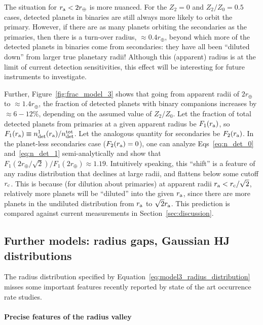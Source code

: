 \documentclass[12pt,modern]{aastex61}
\renewcommand{\a}{_{\rm a}}
\begin{document}
The situation for $r\a < 2r_\oplus$ is more nuanced.
For the $Z_2=0$ and $Z_2/Z_0=0.5$ cases, detected planets in binaries are 
still always more likely to orbit the primary.
However, if there are as many planets orbiting the secondaries as the 
primaries, then there is a turn-over radius, $\approx 0.4r_\oplus$, 
beyond which more of the detected planets in binaries come from secondaries: 
they have all been ``diluted down'' from larger true planetary radii!
Although this (apparent) radius is at the limit of current detection 
sensitivities, this effect will be interesting for future instruments to 
investigate.

Further, Figure~\ref{fig:frac_model_3} shows that going from apparent 
radii of $2r_\oplus$ to $\approx 1.4r_\oplus$, the fraction of detected 
planets with binary companions increases by $\approx 6-12\%$, depending on the 
assumed value of $Z_2/Z_0$.
Let the fraction of total detected planets from primaries at a given 
apparent radius be $F_1(r\a)$, so $F_1(r\a) \equiv n_{\rm det}^1(r\a)/n_{\rm 
det}^{\rm tot}$.
Let the analogous quantity for secondaries be $F_2(r\a)$.
In the planet-less secondaries case ($F_2(r\a)=0$), one can 
analyze Eqs~\ref{eq:n_det_0} and~\ref{eq:n_det_1} semi-analytically and show 
that $F_1(2r_\oplus/\sqrt{2})/F_1(2r_\oplus) \approx 1.19$.
Intuitively speaking, this ``shift'' is a feature of any radius distribution 
that declines at large radii, and flattens below some cutoff $r_{\rm c}$.
This is because (for dilution about primaries)
at apparent radii $r\a < r_{\rm c}/\sqrt{2}$, relatively more planets will be 
``diluted'' into the given $r\a$, since there are more planets in 
the undiluted distribution from $r\a$ to $\sqrt{2}r\a$.
This prediction is compared against current measurements in 
Section~\ref{sec:discussion}.



\subsection{Further models: radius gaps, Gaussian HJ distributions}
\label{sec:further_models}

The radius distribution specified by 
Equation~\ref{eq:model3_radius_distribution} 
misses some important features recently reported by state of the art 
occurrence rate studies.

\paragraph{Precise features of the radius valley}
\end{document}
